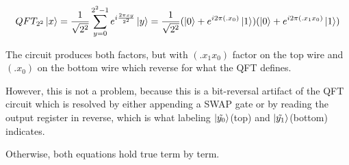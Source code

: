 \documentclass[11pt]{article}
\begin{document}
\begin{enumerate}
\begin{enumerate}
		            \begin{equation*}
			            QFT_{2^2}\ket{x} = \frac{1}{\sqrt{2^2}} \sum_{y=0}^{2^{2}-1}e^{i \frac{2\pi xy}{2^2}}\ket{y} = \frac{1}{\sqrt{2^2}}(\ket{0} + e^{i2{\pi}(.x_0)}\ket{1})(\ket{0}+e^{i2{\pi}(.x_1x_0)}\ket{1}) \end{equation*}

		            The circuit produces both factors, but with $(.x_1x_0)$ factor on the top wire and $(.x_0)$ on the bottom wire which reverse for what the QFT defines.

		            However, this is not a problem, because this is a bit-reversal artifact of the QFT circuit which is resolved by either appending a SWAP gate or by reading the output register in reverse, which is what labeling $\ket{\tilde{y_0}}$(top) and $\ket{\tilde{y_1}}$(bottom) indicates.

		            Otherwise, both equations hold true term by term.

	      \end{enumerate}


\end{enumerate}
\end{document}
